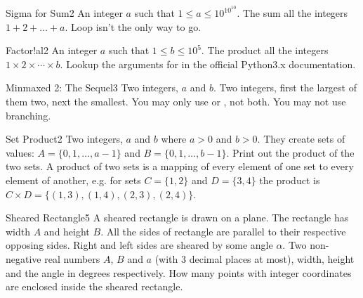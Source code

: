 \begin{task}{Sigma for Sum}{2}
\In
An integer $a$ such that $1 \leq a \leq 10^{10^{10}}$.
\Out
The sum all the integers $1 + 2 + \dots + a$.
\Hint
Loop isn't the only way to go.
\end{task}

\begin{task}{Factor!al}{2}
\In
An integer $a$ such that $1 \leq b \leq 10^{5}$.
\Out
The product all the integers $1 \times 2 \times \cdots \times b$.
\Hint
Lookup the arguments for  in the official Python3.x documentation.
\end{task}

\begin{task}{Minmaxed 2: The Sequel}{3}
\In
Two integers, $a$ and $b$.
\Out
Two integers, first the largest of them two, next the smallest.
\Note
You may  only use  or , not both. You may not use branching.
\end{task}

\begin{task}{Set Product}{2}
\In
Two integers, $a$ and $b$ where $a > 0$ and $b > 0$. They create sets of values:
$A = \{0, 1, \dots, a - 1\}$ and $B = \{0, 1, \dots, b - 1\}$.
\Out
Print out the product of the two sets.
\Note
A product of two sets is a mapping of every element of one set to every element
of another, e.g. for sets $C = \{1, 2\}$ and $D = \{3, 4\}$ the product is
$C \times D = \{(1, 3), (1, 4), (2, 3), (2, 4)\}$.
\end{task}

\begin{task}{Sheared Rectangle}{5}
    A sheared rectangle is drawn on a plane. The rectangle has width $A$ and
    height $B$. All the sides of rectangle are parallel to their respective
    opposing sides. Right and left sides are sheared by some angle $\alpha$.
    \In
    Two non-negative real numbers $A$, $B$ and $a$ (with 3
    decimal places at most), width, height and the angle in degrees respectively.
    \Out
    How many points with integer coordinates are enclosed inside the sheared
    rectangle.
\end{task}

